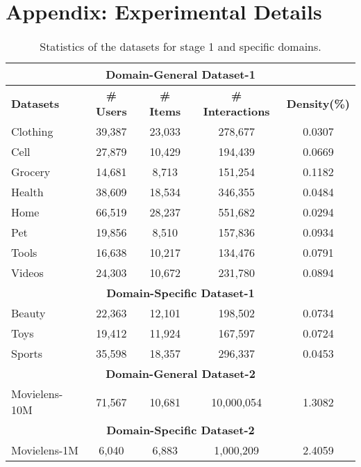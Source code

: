 \section{Appendix: Experimental Details}
\begin{table}[ht]
\small
\centering
\caption{Statistics of the datasets for stage 1 and specific domains.}
\begin{tabular}{lcccc}
\toprule[1.6pt]  %
\multicolumn{5}{c}{\textbf{Domain-General Dataset-1}} \\
\midrule[0.8pt]
\textbf{Datasets} & \textbf{\# Users} & \textbf{\# Items} & \textbf{\# Interactions} & \textbf{Density(\%)} \\
\midrule[0.8pt]
Clothing & 39,387 & 23,033 & 278,677 & 0.0307 \\
Cell & 27,879 & 10,429 & 194,439 & 0.0669 \\
Grocery & 14,681 & 8,713 & 151,254 & 0.1182 \\
Health & 38,609 & 18,534 & 346,355 & 0.0484 \\
Home & 66,519 & 28,237 & 551,682 & 0.0294 \\
Pet & 


19,856 & 8,510 & 157,836 & 0.0934 \\
Tools & 16,638 & 10,217 & 134,476 & 0.0791 \\
Videos & 24,303 & 10,672 & 231,780 & 0.0894 \\
\midrule[0.8pt]
\multicolumn{5}{c}{\textbf{Domain-Specific Dataset-1}} \\
\midrule[0.8pt]
Beauty & 22,363 & 12,101 & 198,502 & 0.0734 \\
Toys & 19,412 & 11,924 & 167,597 & 0.0724 \\
Sports & 35,598 & 18,357 & 296,337 & 0.0453 \\
\midrule[1.6pt]
\multicolumn{5}{c}{\textbf{Domain-General Dataset-2}} \\
\midrule[0.8pt]
Movielens-10M & 71,567 & 10,681 & 10,000,054 & 1.3082 \\
\midrule[0.8pt]
\multicolumn{5}{c}{\textbf{Domain-Specific Dataset-2}} \\
\midrule[0.8pt]
Movielens-1M & 6,040 & 6,883 & 1,000,209 & 2.4059 \\
\bottomrule[1.6pt]  %
\end{tabular}
\label{tab:data}
\end{table}

